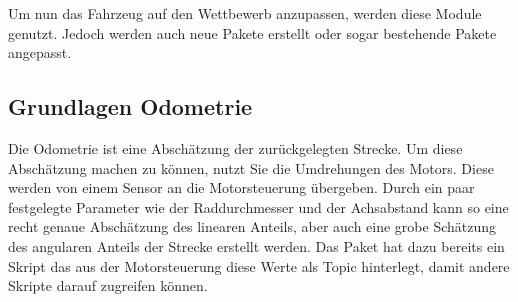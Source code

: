 Um nun das Fahrzeug auf den Wettbewerb anzupassen, werden diese Module genutzt. Jedoch werden auch neue Pakete erstellt oder sogar bestehende Pakete angepasst.


\subsection{Grundlagen Odometrie}
Die Odometrie ist eine Abschätzung der zurückgelegten Strecke. Um diese Abschätzung machen zu können, nutzt Sie die Umdrehungen des Motors. Diese werden von einem Sensor an die Motorsteuerung übergeben. Durch ein paar festgelegte Parameter wie der Raddurchmesser und der Achsabstand kann so eine recht genaue Abschätzung des linearen Anteils, aber auch eine grobe Schätzung des angularen Anteils der Strecke erstellt werden.  Das Paket  hat dazu bereits ein Skript das aus der Motorsteuerung diese Werte als Topic hinterlegt, damit andere Skripte darauf zugreifen können.
